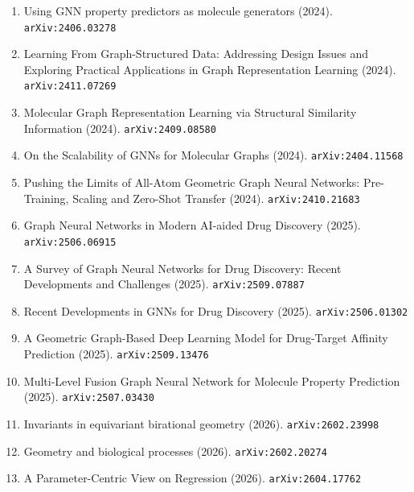 \documentclass[11pt]{article}
\begin{document}
\begin{enumerate}
  networks (2023). \texttt{arXiv:2312.03613}
  \item Using GNN property predictors as molecule generators (2024). \texttt{arXiv:2406.03278}
  \item Learning From Graph-Structured Data: Addressing Design Issues and
  Exploring Practical Applications in Graph Representation Learning (2024). \texttt{arXiv:2411.07269}
  \item Molecular Graph Representation Learning via Structural Similarity
  Information (2024). \texttt{arXiv:2409.08580}
  \item On the Scalability of GNNs for Molecular Graphs (2024). \texttt{arXiv:2404.11568}
  \item Pushing the Limits of All-Atom Geometric Graph Neural Networks:
  Pre-Training, Scaling and Zero-Shot Transfer (2024). \texttt{arXiv:2410.21683}
  \item Graph Neural Networks in Modern AI-aided Drug Discovery (2025). \texttt{arXiv:2506.06915}
  \item A Survey of Graph Neural Networks for Drug Discovery: Recent Developments and Challenges (2025). \texttt{arXiv:2509.07887}
  \item Recent Developments in GNNs for Drug Discovery (2025). \texttt{arXiv:2506.01302}
  \item A Geometric Graph-Based Deep Learning Model for Drug-Target Affinity Prediction (2025). \texttt{arXiv:2509.13476}
  \item Multi-Level Fusion Graph Neural Network for Molecule Property Prediction (2025). \texttt{arXiv:2507.03430}
  \item Invariants in equivariant birational geometry (2026). \texttt{arXiv:2602.23998}
  \item Geometry and biological processes (2026). \texttt{arXiv:2602.20274}
  \item A Parameter-Centric View on Regression (2026). \texttt{arXiv:2604.17762}
\end{enumerate}
\end{document}
